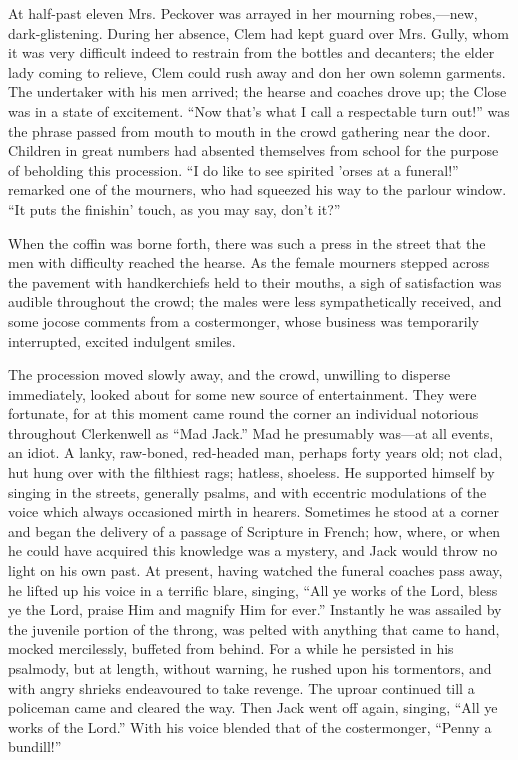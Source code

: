 At half-past eleven Mrs. Peckover was arrayed in her mourning
robes,---new, dark-glistening. During her absence, Clem had kept guard
over Mrs. Gully, whom it was very difficult indeed to restrain from the
bottles and decanters; the elder lady coming to relieve, Clem could rush
away and don her own solemn garments. The undertaker with his men
arrived; the hearse and coaches drove up; the Close was in a state of
excitement. ``Now that's what I call a respectable turn out!'' was the
phrase passed from mouth to mouth in the crowd gathering near the door.
Children in great numbers had {}absented themselves from school for the
purpose of beholding this procession. ``I do like to see spirited 'orses
at a funeral!'' remarked one of the mourners, who had squeezed his way
to the parlour window. ``It puts the finishin' touch, as you may say,
don't it?''

When the coffin was borne forth, there was such a press in the street
that the men with difficulty reached the hearse. As the female mourners
stepped across the pavement with handkerchiefs held to their mouths, a
sigh of satisfaction was audible throughout the crowd; the males were
less sympathetically received, and some jocose comments from a
costermonger, whose business was temporarily interrupted, excited
indulgent smiles.

The procession moved slowly away, and the crowd, unwilling to disperse
immediately, looked about for some new source of entertainment. They
were fortunate, for at this moment came round the corner an individual
notorious throughout Clerkenwell as ``Mad Jack.'' Mad he presumably
was---at all events, an idiot. A lanky, raw-boned, {}red-headed man,
perhaps forty years old; not clad, hut hung over with the filthiest
rags; hatless, shoeless. He supported himself by singing in the streets,
generally psalms, and with eccentric modulations of the voice which
always occasioned mirth in hearers. Sometimes he stood at a corner and
began the delivery of a passage of Scripture in French; how, where, or
when he could have acquired this knowledge was a mystery, and Jack would
throw no light on his own past. At present, having watched the funeral
coaches pass away, he lifted up his voice in a terrific blare, singing,
``All ye works of the Lord, bless ye the Lord, praise Him and magnify
Him for ever.'' Instantly he was assailed by the juvenile portion of the
throng, was pelted with anything that came to hand, mocked mercilessly,
buffeted from behind. For a while he persisted in his psalmody, but at
length, without warning, he rushed upon his tormentors, and with angry
shrieks endeavoured to take revenge. The uproar continued till a
policeman came and cleared {}the way. Then Jack went off again, singing,
``All ye works of the Lord.'' With his voice blended that of the
costermonger, ``Penny a bundill!''

